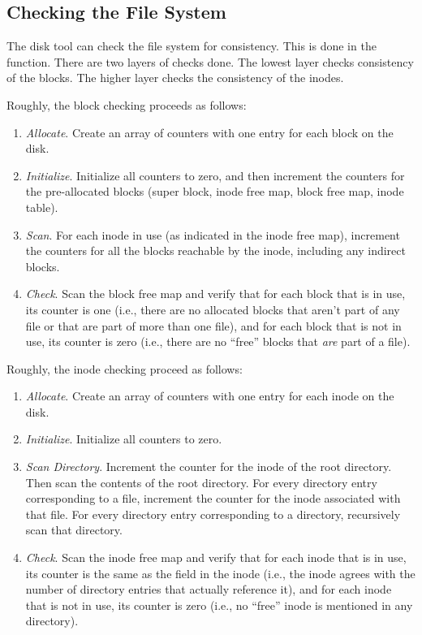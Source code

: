 \subsection{Checking the File System}
\label{sec:disktool-check}

The disk tool can check the file system for consistency. This is done in the
 function. There are two layers of checks done. The lowest layer checks
consistency of the blocks. The higher layer checks the consistency of the inodes.

Roughly, the block checking proceeds as follows:

\begin{enumerate}
  \item \textit{Allocate}. Create an array of counters with one entry for each block on the
  disk.

  \item \textit{Initialize}. Initialize all counters to zero, and then increment the counters
  for the pre-allocated blocks (super block, inode free map, block free map, inode table).

  \item \textit{Scan}. For each inode in use (as indicated in the inode free map), increment the
  counters for all the blocks reachable by the inode, including any indirect blocks.

  \item \textit{Check}. Scan the block free map and verify that for each block that is in use,
  its counter is one (i.e., there are no allocated blocks that aren't part of any file or that
  are part of more than one file), and for each block that is not in use, its counter is zero
  (i.e., there are no ``free'' blocks that \emph{are} part of a file).
\end{enumerate}

Roughly, the inode checking proceed as follows:

\begin{enumerate}
  \item \textit{Allocate}. Create an array of counters with one entry for each inode on the
  disk.

  \item \textit{Initialize}. Initialize all counters to zero.
  
  \item \textit{Scan Directory}. Increment the counter for the inode of the root directory. Then
  scan the contents of the root directory. For every directory entry corresponding to a file,
  increment the counter for the inode associated with that file. For every directory entry
  corresponding to a directory, recursively scan that directory.

  \item \textit{Check}. Scan the inode free map and verify that for each inode that is in use,
  its counter is the same as the  field in the inode (i.e., the inode agrees with
  the number of directory entries that actually reference it), and for each inode that is not in
  use, its counter is zero (i.e., no ``free'' inode is mentioned in any directory).
\end{enumerate}

